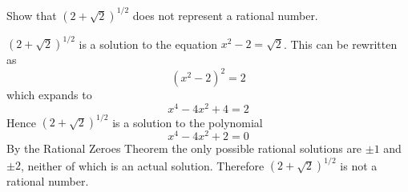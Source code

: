 
Show that $(2+\sqrt2)^{1/2}$ does not represent a rational number.

\medskip
$(2+\sqrt2)^{1/2}$ is a solution to the equation
$x^2-2=\sqrt2$.
This can be rewritten as
$$(x^2-2)^2=2$$
which expands to
$$x^4-4x^2+4=2$$
Hence $(2+\sqrt2)^{1/2}$ is a solution to the polynomial
$$x^4-4x^2+2=0$$
By the Rational Zeroes Theorem the only possible rational solutions
are $\pm1$ and $\pm2$, neither of which is an actual solution.
Therefore $(2+\sqrt2)^{1/2}$ is not a rational number.

